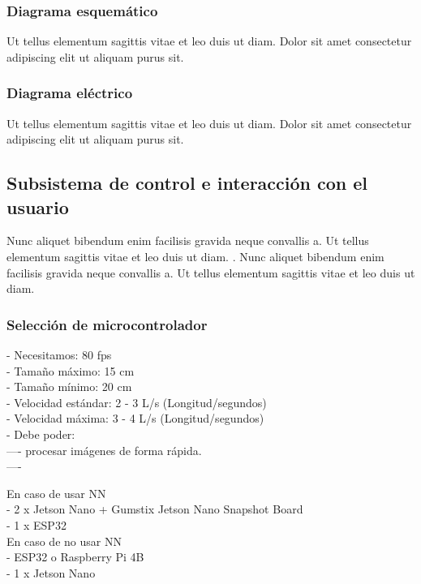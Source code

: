 \subsubsection{Diagrama esquemático} 

Ut tellus elementum sagittis vitae et leo duis ut diam. Dolor sit amet consectetur adipiscing elit ut aliquam purus sit.


\subsubsection{Diagrama eléctrico} 

Ut tellus elementum sagittis vitae et leo duis ut diam. Dolor sit amet consectetur adipiscing elit ut aliquam purus sit.

\subsection{Subsistema de control e interacción con el usuario}

Nunc aliquet bibendum enim facilisis gravida neque convallis a. Ut tellus elementum sagittis vitae et leo duis ut diam. . Nunc aliquet bibendum enim facilisis gravida neque convallis a. Ut tellus elementum sagittis vitae et leo duis ut diam. 


\subsubsection{Selección de microcontrolador}
\label{sssec:seleccion de microcontrolador}

- Necesitamos: 80 fps \\
- Tamaño máximo: 15 cm \\
- Tamaño mínimo: 20 cm \\
- Velocidad estándar: 2 - 3 L/s (Longitud/segundos) \\
- Velocidad máxima: 3 - 4 L/s (Longitud/segundos) \\
- Debe poder: \\
---- procesar imágenes de forma rápida. \\
----  

En caso de usar NN \\
- 2 x Jetson Nano + Gumstix Jetson Nano Snapshot Board \\
- 1 x ESP32 \\

En caso de no usar NN \\
- ESP32 o Raspberry Pi 4B \\
- 1 x Jetson Nano \\

